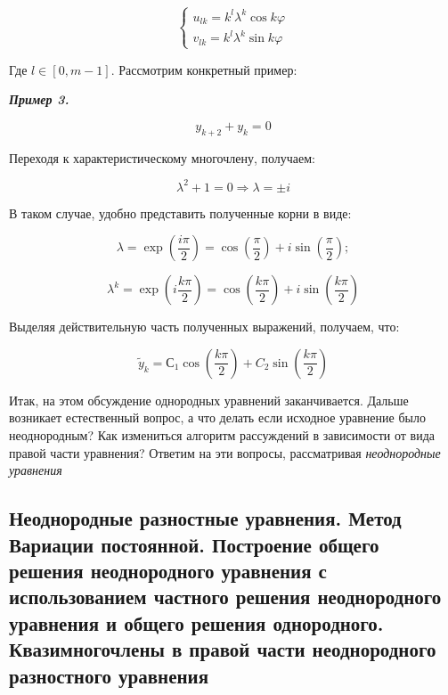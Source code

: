 \documentclass[10pt,a4paper]{article}
\begin{document}
	\begin{equation}
		\begin{cases}
			u_{lk} = k^{l}\lambda^{k}\cos k\varphi
			\\
			v_{lk} = k^{l}\lambda^{k}\sin k\varphi
		\end{cases}
	\end{equation}
	
	Где $l \in \left[0, m - 1\right] $. Рассмотрим конкретный пример:
	
	\textit{\textbf{Пример 3.}}
	
	\begin{equation}
		y_{k + 2} + y_{k} = 0
	\end{equation}
	
	Переходя к характеристическому многочлену, получаем:
	
	\begin{equation}
		\lambda^{2} + 1 = 0 \Rightarrow \lambda = \pm i
	\end{equation}
	
	В таком случае, удобно представить полученные корни в виде:
	
	\begin{equation}
		\lambda = \exp\left(\frac{i\pi}{2}\right) = \cos\left(
		\frac{\pi}{2}\right) + i\sin\left(\frac{\pi}{2}\right);
	\end{equation}
	
	\begin{equation}
		\lambda^{k} = \exp\left(i\frac{k\pi}{2}\right) = 
		\cos\left(\frac{k\pi}{2}\right) + i\sin\left(\frac{k\pi}{2}\right)
	\end{equation}
	
	Выделяя действительную часть полученных выражений, получаем, что:
	
	\begin{equation}
		\widetilde{y}_{k} = С_{1}\cos\left(\frac{k\pi}{2}\right) + 
		C_{2}\sin\left(\frac{k\pi}{2}\right)
	\end{equation}
	
	Итак, на этом обсуждение однородных уравнений заканчивается. Дальше 
	возникает естественный вопрос, а что делать если исходное уравнение было 
	неоднородным? Как измениться алгоритм рассуждений в зависимости от вида 
	правой части уравнения? Ответим на эти вопросы, рассматривая 
	\textit{неоднородные уравнения}
	
	\subsection{Неоднородные разностные уравнения. Метод Вариации постоянной.
	Построение общего решения неоднородного уравнения с использованием частного
	решения неоднородного уравнения и общего решения однородного. 
	Квазимногочлены в правой части неоднородного разностного уравнения}
	
	
\end{document}
